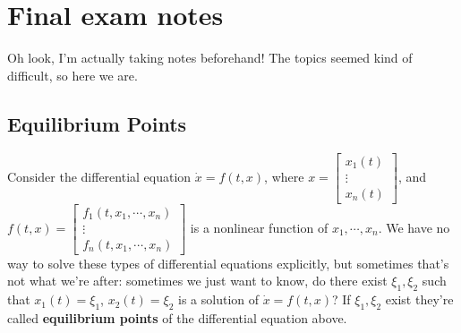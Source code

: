 \section{Final exam notes}
Oh look, I'm actually taking notes beforehand! The topics seemed kind of difficult, so here we are.

\subsection{Equilibrium Points}
Consider the differential equation $\dot x=f(t,x)$, where $x=
\begin{bmatrix}
    x_1(t)\\ \vdots \\ x_n (t)
\end{bmatrix}$, and $f(t,x)=
\begin{bmatrix}
    f_1(t,x_1,\cdots ,x_n ) \\ \vdots \\ f_n (t,x_1,\cdots ,x_n) 
\end{bmatrix}$ is a nonlinear function of $x_1,\cdots ,x_n $. We have no way to solve these types of differential equations explicitly, but sometimes that's not what we're after: sometimes we just want to know, do there exist $\xi_1,\xi_2$ such that $x_1(t)=\xi_1$, $x_2(t)=\xi_2$ is a solution of $\dot x=f(t,x)$? If $\xi_1,\xi_2$ exist they're called \textbf{equilibrium points} of the differential equation above.

